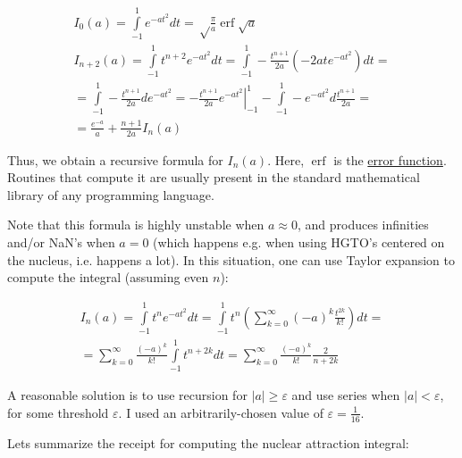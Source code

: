 \documentclass{article}
\begin{document}
\begin{appendices}
\begin{equation} \label{eq:int-exp-tn-recursion}
\begin{gathered}
I_0(a) = \int\limits_{-1}^1 e^{-at^2} dt = \sqrt\frac{\pi}{a} \operatorname{erf}{\sqrt a} \\
I_{n+2}(a) = \int\limits_{-1}^1 t^{n+2} e^{-at^2} dt = \int\limits_{-1}^1 -\frac{t^{n+1}}{2a} (-2ate^{-at^2}) dt = \\
= \int\limits_{-1}^1 -\frac{t^{n+1}}{2a} de^{-at^2} = \left. -\frac{t^{n+1}}{2a} e^{-at^2} \right|_{-1}^1 - \int\limits_{-1}^1 -e^{-at^2} d\frac{t^{n+1}}{2a} = \\
= \frac{e^{-a}}{a} + \frac{n+1}{2a} I_n(a)
\end{gathered}
\end{equation}

Thus, we obtain a recursive formula for \(I_n(a)\). Here, \(\operatorname{erf}\) is the \href{https://en.wikipedia.org/wiki/Error_function}{error function}. Routines that compute it are usually present in the standard mathematical library of any programming language.

Note that this formula is highly unstable when \(a \approx 0\), and produces infinities and/or NaN's when \(a=0\) (which happens e.g. when using HGTO's centered on the nucleus, i.e. happens a lot). In this situation, one can use Taylor expansion to compute the integral (assuming even \(n\)):

\begin{equation} \label{eq:int-exp-tn-series}
\begin{gathered}
I_n(a) = \int\limits_{-1}^1 t^n e^{-at^2} dt = \int\limits_{-1}^1 t^n \left( \sum\limits_{k=0}^\infty (-a)^k \frac{t^{2k}}{k!} \right) dt = \\
= \sum\limits_{k=0}^\infty \frac{(-a)^k}{k!} \int\limits_{-1}^1 t^{n+2k} dt = \sum\limits_{k=0}^\infty \frac{(-a)^k}{k!} \frac{2}{n+2k}
\end{gathered}
\end{equation}

A reasonable solution is to use recursion for \(|a| \geq \varepsilon\) and use series when \(|a| < \varepsilon\), for some threshold \(\varepsilon\). I used an arbitrarily-chosen value of \(\varepsilon = \frac{1}{16}\).

Lets summarize the receipt for computing the nuclear attraction integral:


\end{appendices}
\end{document}
